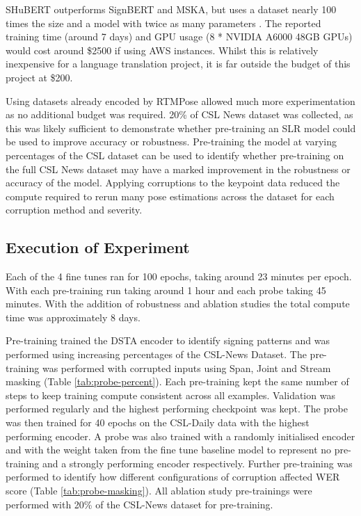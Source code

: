 \documentclass{article}
\begin{document}
SHuBERT outperforms SignBERT and MSKA, but uses a dataset nearly 100 times the size and a model with twice as many parameters \cite{uthus_youtube-asl_2023}. The reported training time (around 7 days) and GPU usage (8 * NVIDIA A6000 48GB GPUs) would cost around \$2500 if using AWS instances. Whilst this is relatively inexpensive for a language translation project, it is far outside the budget of this project at \$200.

Using datasets already encoded by RTMPose allowed much more experimentation as no additional budget was required. 20\% of CSL News dataset was collected, as this was likely sufficient to demonstrate whether pre-training an SLR model could be used to improve accuracy or robustness. Pre-training the model at varying percentages of the CSL dataset can be used to identify whether pre-training on the full CSL News dataset may have a marked improvement in the robustness or accuracy of the model. Applying corruptions to the keypoint data reduced the compute required to rerun many pose estimations across the dataset for each corruption method and severity.

\subsection{Execution of Experiment}
Each of the 4 fine tunes ran for 100 epochs, taking around 23 minutes per epoch. With each pre-training run taking around 1 hour and each probe taking 45 minutes. With the addition of robustness and ablation studies the total compute time was approximately 8 days.

Pre-training trained the DSTA encoder to identify signing patterns and was performed using increasing percentages of the CSL-News Dataset. The pre-training was performed with corrupted inputs using Span, Joint and Stream masking (Table \ref{tab:probe-percent}). Each pre-training kept the same number of steps to keep training compute consistent across all examples. Validation was performed regularly and the highest performing checkpoint was kept. The probe was then trained for 40 epochs on the CSL-Daily data with the highest performing encoder. A probe was also trained with a randomly initialised encoder and with the weight taken from the fine tune baseline model to represent no pre-training and a strongly performing encoder respectively. Further pre-training was performed to identify how different configurations of corruption affected WER score (Table \ref{tab:probe-masking}). All ablation study pre-trainings were performed with 20\% of the CSL-News dataset for pre-training. 
\end{document}
